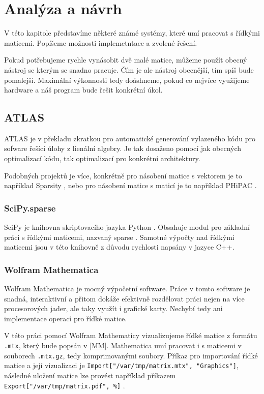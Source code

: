 \chapter{Analýza a návrh}

V této kapitole představíme některé známé systémy, které umí pracovat s řídkými maticemi. Popíšeme možnosti implemetntace a zvolené řešení.

Pokud potřebujeme rychle vynásobit dvě malé matice, můžeme použít obecný nástroj se kterým se snadno pracuje. Čím je ale nástroj obecnější, tím spíš bude pomalejší. Maximální výkonnosti tedy doáshneme, pokud co nejvíce využijeme hardware a náš program bude řešit konkrétní úkol. 

\section{ATLAS}

ATLAS \cite{atlas} je v překladu zkratkou pro automatické generování vylazeného kódu pro sofware řešící úlohy z lienální algebry. Je tak dosaženo pomocí jak obecných optimalizací kódu, tak optimalizací pro konkrétní architektury.

Podobných projektů je více, konkrétně pro násobení matice s vektorem je to například Sparsity \cite{sparsity}, nebo pro násobení matice s maticí je to například PHiPAC \cite{PHiPAC}\cite{bilmes96a}.

\subsection{SciPy.sparse}

SciPy je knihovna skriptovacího jazyka Python \cite{Python}. Obsahuje modul pro základní práci s řídkými maticemi, nazvaný sparse \cite{scipy}. Samotné výpočty nad řídkými maticemi jsou v této knihovně z důvodu rychlosti napsány v jazyce C++.

\subsection{Wolfram Mathematica}

Wolfram Mathematica \cite{mathematica} je mocný výpočetní software. Práce v tomto software je snadná, interaktivní a přitom dokáže efektivně rozdělovat práci nejen na více procesorových jader, ale taky využít i grafické karty. Nechybí tedy ani implementace operací pro řídké matice.

V této práci pomocí Wolfram Mathematicy vizualizujeme řídké matice z formátu \texttt{.mtx}, který bude popsán v \ref{MM}. Mathematica umí pracovat i s maticemi v souborech \texttt{.mtx.gz}, tedy komprimovanými soubory. Příkaz pro importování řídké matice a její vizualizaci je \texttt{Import["/var/tmp/matrix.mtx", "Graphics"]}, následné uložení matice lze provést například příkazem \\ \texttt{Export["/var/tmp/matrix.pdf", \%]} \cite{mathematicaMTX}.

